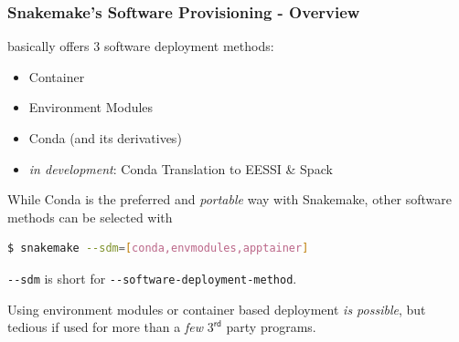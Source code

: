 \begin{frame}[fragile]
	\frametitle{Snakemake's Software Provisioning - Overview}
	\Snakemake{} basically offers 3 software deployment methods:
	\begin{itemize}[<+->]
		\item Container
		\item Environment Modules
		\item Conda (and its derivatives)
		\item \emph{in development}: Conda Translation to EESSI \& Spack
	\end{itemize}
    \pause
    While Conda is the preferred and \emph{portable} way with Snakemake, other software methods can be selected with
    \begin{lstlisting}[language=Bash, style=Shell]
$ snakemake --sdm=[conda,envmodules,apptainer]
    \end{lstlisting}
    \verb+--sdm+ is short for \verb+--software-deployment-method+.
    \pause
    \begin{hint}
    	Using environment modules or container based deployment \emph{is possible}, but tedious if used for more than a \emph{few} $3^{\mathsf{rd}}$ party programs.
    \end{hint}
\end{frame}
%	
%
